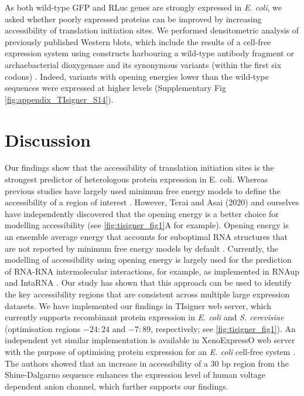 As both wild-type GFP and RLuc genes are strongly expressed in \textit{E. coli}, we asked whether poorly expressed proteins can be improved by increasing accessibility of translation initiation sites. We performed densitometric analysis of previously published Western blots, which include the results of a cell-free expression system using constructs harbouring a wild-type antibody fragment or archaebacterial dioxygenase and its synonymous variants (within the first six codons) \cite{Voges2004-dt}. Indeed, variants with opening energies lower than the wild-type sequences were expressed at higher levels (Supplementary Fig \ref{fig:appendix_TIsigner_S14}).

\section{Discussion}
Our findings show that the accessibility of translation initiation sites is the strongest predictor of heterologous protein expression in E. coli. Whereas previous studies have largely used minimum free energy models to define the accessibility of a region of interest \cite{Salis2009-dh,Bhattacharyya2018-zy,Nieuwkoop2019-ft,Voges2004-dt,Pelletier1987-np}. However, Terai and Asai (2020) and ourselves have independently discovered that the opening energy is a better choice for modelling accessibility \cite{Bhandari2019-tl,Terai2020-zr} (see \ref{fig:tisigner_fig1}A for example). Opening energy is an ensemble average energy that accounts for suboptimal RNA structures that are not reported by minimum free energy models by default \cite{Muckstein2006-ys,Bernhart2011-cc}. Currently, the modelling of accessibility using opening energy is largely used for the prediction of RNA-RNA intermolecular interactions, for example, as implemented in RNAup and IntaRNA \cite{Lorenz2011-rg,Mann2017-yy}. Our study has shown that this approach can be used to identify the key accessibility regions that are consistent across multiple large expression datasets. We have implemented our findings in TIsigner web server, which currently supports recombinant protein expression in \textit{E. coli} and \textit{S. cerevisiae} (optimisation regions $−24:24$ and $−7:89$, respectively; see \ref{fig:tisigner_fig1}). An independent yet similar implementation is available in XenoExpressO web server with the purpose of optimising protein expression for an \textit{E. coli} cell-free system \cite{Zayni2018-wc}. The authors showed that an increase in accessibility of a 30 bp region from the Shine-Dalgarno sequence enhances the expression level of human voltage dependent anion channel, which further supports our findings.

